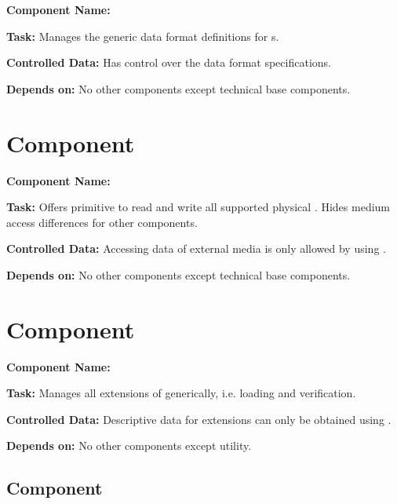 \textbf{Component Name:} \COMPdataFormatManagement{}

\textbf{Task:} Manages the generic data format definitions for \TERMcontainerFormat{}s.

\textbf{Controlled Data:} Has control over the data format specifications.

\textbf{Depends on:} No other components except technical base components.


\section{Component \COMPmedia{}}
\label{sec:COMPmediumAccess}

\textbf{Component Name:} \COMPmedia{}

\textbf{Task:} Offers primitive to read and write all supported physical \TERMmedium{}. Hides medium access differences for other components.

\textbf{Controlled Data:} Accessing data of external media is only allowed by using \COMPmedia{}.

\textbf{Depends on:} No other components except technical base components.


\section{Component \COMPextensionManagement{}}
\label{sec:COMPextensionManagement}

\textbf{Component Name:} \COMPextensionManagement{}

\textbf{Task:} Manages all extensions of \LibName{} generically, i.e. loading and verification.

\textbf{Controlled Data:} Descriptive data for extensions can only be obtained using \COMPextensionManagement{}.

\textbf{Depends on:} No other components except utility.


\subsection{Component \COMPcomponentRegistry{}}
\label{sec:COMPcomponentRegistry}

